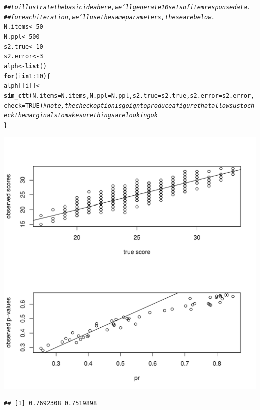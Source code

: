 \documentclass{article}\usepackage[]{graphicx}\usepackage[]{color}
\makeatletter
\def\maxwidth{ %
  \ifdim\Gin@nat@width>\linewidth
    \linewidth
  \else
    \Gin@nat@width
  \fi
}
\newcommand{\hlnum}[1]{\textcolor[rgb]{0.686,0.059,0.569}{#1}}%
\newcommand{\hlcom}[1]{\textcolor[rgb]{0.678,0.584,0.686}{\textit{#1}}}%
\newcommand{\hlopt}[1]{\textcolor[rgb]{0,0,0}{#1}}%
\newcommand{\hlstd}[1]{\textcolor[rgb]{0.345,0.345,0.345}{#1}}%
\newcommand{\hlkwa}[1]{\textcolor[rgb]{0.161,0.373,0.58}{\textbf{#1}}}%
\newcommand{\hlkwb}[1]{\textcolor[rgb]{0.69,0.353,0.396}{#1}}%
\newcommand{\hlkwc}[1]{\textcolor[rgb]{0.333,0.667,0.333}{#1}}%
\newcommand{\hlkwd}[1]{\textcolor[rgb]{0.737,0.353,0.396}{\textbf{#1}}}%
\newenvironment{kframe}{%
 \def\at@end@of@kframe{}%
 \ifinner\ifhmode%
  \def\at@end@of@kframe{\end{minipage}}%
  \begin{minipage}{\columnwidth}%
 \fi\fi%
 \def\FrameCommand##1{\hskip\@totalleftmargin \hskip-\fboxsep
 \colorbox{shadecolor}{##1}\hskip-\fboxsep
     \hskip-\linewidth \hskip-\@totalleftmargin \hskip\columnwidth}%
 \MakeFramed {\advance\hsize-\width
   \@totalleftmargin\z@ \linewidth\hsize
   \@setminipage}}%
 {\par\unskip\endMakeFramed%
 \at@end@of@kframe}
\newenvironment{knitrout}{}{} %
\makeatother
\begin{document}
\begin{knitrout}
\begin{kframe}
\begin{alltt}
\hlcom{##to illustrate the basic idea here, we'll generate 10 sets of item response data.}
\hlcom{##for each iteration, we'll use the same parameters, these are below.}
\hlstd{N.items}\hlkwb{<-}\hlnum{50}
\hlstd{N.ppl}\hlkwb{<-}\hlnum{500}
\hlstd{s2.true}\hlkwb{<-}\hlnum{10}
\hlstd{s2.error}\hlkwb{<-}\hlnum{3}
\hlstd{alph}\hlkwb{<-}\hlkwd{list}\hlstd{()}
\hlkwa{for} \hlstd{(i} \hlkwa{in} \hlnum{1}\hlopt{:}\hlnum{10}\hlstd{) \{}
    \hlstd{alph[[i]]}\hlkwb{<-}\hlkwd{sim_ctt}\hlstd{(}\hlkwc{N.items}\hlstd{=N.items,}\hlkwc{N.ppl}\hlstd{=N.ppl,}\hlkwc{s2.true}\hlstd{=s2.true,}\hlkwc{s2.error}\hlstd{=s2.error,}\hlkwc{check}\hlstd{=}\hlnum{TRUE}\hlstd{)} \hlcom{#note, the check option is goign to produce a figure that allows us to check the marginals to make sure things are looking ok}
\hlstd{\}}
\end{alltt}
\end{kframe}
\includegraphics[width=\maxwidth]{figure/unnamed-chunk-2-1} 
\begin{kframe}\begin{verbatim}
## [1] 0.7692308 0.7519898
\end{verbatim}
\end{kframe}

\end{knitrout}
\end{document}
